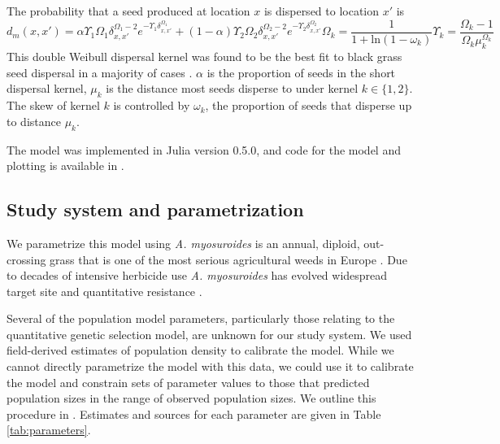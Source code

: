 \documentclass[10pt,letterpaper]{article}
\begin{document}
The probability that a seed produced at location $x$ is dispersed to location $x'$ is 
\begin{subequations}\label{eq:seed_disp}
\begin{equation}\label{eq:seed_kern}
	d_m(x, x') = \alpha \Upsilon_1 \Omega_1 \delta_{x,x'}^{\Omega_1 - 2} e^{-\Upsilon_1 \delta_{x,x'}^{\Omega_1}} + (1 - \alpha) \Upsilon_2 \Omega_2 \delta_{x,x'}^{\Omega_2 - 2} e^{-\Upsilon_2 \delta_{x,x'}^{\Omega_2}}  
\end{equation}
\begin{equation}\label{eq:shape}
	\Omega_k = \frac{1}{1 + \text{ln}(1 - \omega_k)}
\end{equation}
\begin{equation}\label{eq:scale}
	\Upsilon_k = \frac{\Omega_k - 1}{\Omega_k \mu_k^{\Omega_k}}
\end{equation}
\end{subequations} 
This double Weibull dispersal kernel was found to be the best fit to black grass seed dispersal in a majority of cases \cite{Colb2001}. $\alpha$ is the proportion of seeds in the short dispersal kernel, $\mu_k$ is the distance most seeds disperse to under kernel $k \in \{1, 2\}$. The skew of kernel $k$ is controlled by $\omega_k$, the proportion of seeds that disperse up to distance $\mu_k$. 
 
The model was implemented in Julia version 0.5.0, and code for the model and plotting is available in .

\subsection*{Study system and parametrization}
We parametrize this model using \textit{A. myosuroides} is an annual, diploid, out-crossing grass that is one of the most serious agricultural weeds in Europe \cite{Moss2007}. Due to decades of intensive herbicide use \textit{A. myosuroides} has evolved widespread target site \cite{Moss2007} and quantitative resistance \cite{Yu2014}.   

Several of the population model parameters, particularly those relating to the quantitative genetic selection model, are unknown for our study system. We used field-derived estimates of population density to calibrate the model. While we cannot directly parametrize the model with this data, we could use it to calibrate the model and constrain sets of parameter values to those that predicted population sizes in the range of observed population sizes. We outline this procedure in . Estimates and sources for each parameter are given in Table \ref{tab:parameters}.          
\end{document}
